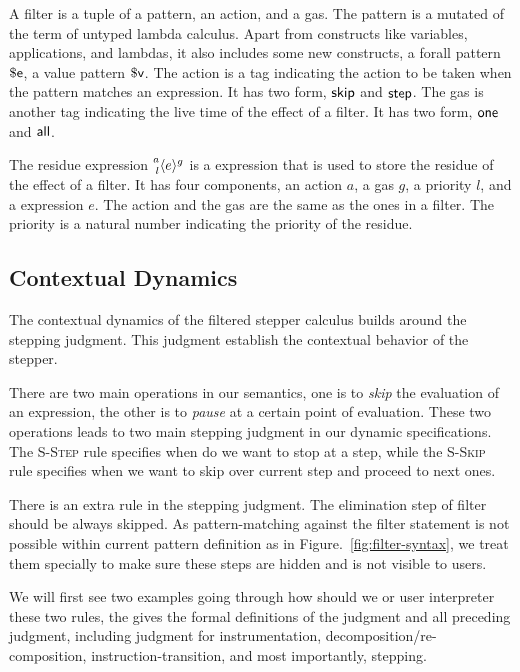 A filter is a tuple of a pattern, an action, and a gas. The pattern
is a mutated of the term of untyped lambda calculus. Apart from constructs like
variables, applications, and lambdas, it also includes some new constructs, a
forall pattern \(\PatExpr\), a value pattern \(\PatValue\). The action is a tag indicating
the action to be taken when the pattern matches an expression. It has two
form, \(\ActSkip\) and \(\ActStep\). The gas is another tag indicating the
live time of the effect of a filter. It has two form, \(\GasOne\) and
\(\GasAll\).

The residue expression \(\Residue{a}{g}{l}{e}\) is a expression that is used to
store the residue of the effect of a filter. It has four components, an action
\(a\), a gas \(g\), a priority \(l\), and a expression \(e\). The action and the
gas are the same as the ones in a filter. The priority is a natural number
indicating the priority of the residue.

\subsection{Contextual Dynamics}

The contextual dynamics of the filtered stepper calculus builds around the stepping judgment. This judgment establish the contextual behavior of the stepper.

There are two main operations in our semantics, one is to \emph{skip} the
evaluation of an expression, the other is to \emph{pause} at a certain point of
evaluation. These two operations leads to two main stepping judgment in our
dynamic specifications. The \textsc{S-Step} rule specifies when do we want to
stop at a step, while the \textsc{S-Skip} rule specifies when we want to skip over
current step and proceed to next ones.

There is an extra rule in the stepping judgment. The elimination step of filter
should be always skipped. As pattern-matching against the filter statement is
not possible within current pattern definition as in
Figure.~\ref{fig:filter-syntax}, we treat them specially to make sure these
steps are hidden and is not visible to users.

We will first see two examples going through how should we or user interpreter these two rules, the gives the formal definitions of the judgment and all preceding judgment, including judgment for instrumentation, decomposition/re-composition, instruction-transition, and most importantly, stepping.

